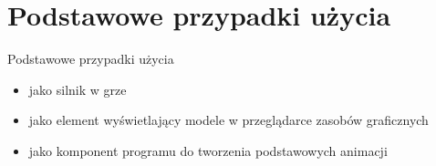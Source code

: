 \documentclass[11pt,leqno]{article}
\begin{document}
\section{Podstawowe przypadki użycia}
Podstawowe przypadki użycia
\begin{itemize}
\item jako silnik w grze
\item jako element wyświetlający modele w przeglądarce zasobów graficznych
\item jako komponent programu do tworzenia podstawowych animacji
\end{itemize}
\end{document}
